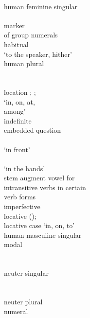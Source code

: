 \begin{multicols}{2}
\begin{tabbing}
				\>	\\
				\>	human feminine singular\\
				\>	\\
				\>  marker\\
				\>  of group numerals\\
				\>	habitual\\
				\>	 `to the speaker, hither'\\
				\>	human plural\\
				\>	\\
				\>	\\
				\>	location \sqt{in};  ;\\
			{}		\>	     `in, on, at, \\ \> among' \\
				\>	indefinite\\
				\>	embedded question\\
				\>	\\
				\>	 `in front'\\
				\>	\\
						\>  `in the hands'\\
				\>	stem augment vowel for \\ \> intransitive verbs in certain \\ \> verb forms\\
				\>	imperfective\\
				\>	locative ();\\
			{}		\>	locative case `in, on, to'\\
					\>	human masculine singular\\
				\>	modal\\
				\>	\\
				\>	\\
					\>	neuter singular\\
				\>	\\
				\>	\\
				\>	neuter plural\\
				\>	numeral\\

\end{tabbing}
\end{multicols}
